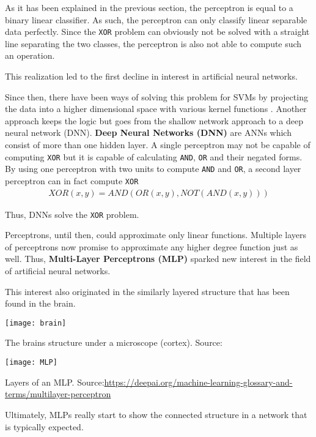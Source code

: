 As it has been explained in the previous section, the perceptron is equal to a binary linear classifier.
As such, the perceptron can only classify linear separable data perfectly.
Since the \lstinline|XOR| problem can obviously not be solved with a straight line separating the two classes, the perceptron is also not able to compute such an operation. 

This realization led to the first decline in interest in artificial neural networks.

Since then, there have been ways of solving this problem for SVMs by projecting the data into a higher dimensional space with various kernel functions \cite{ommer}.
Another approach keeps the logic but goes from the shallow network approach to a deep neural network (DNN).
\textbf{Deep Neural Networks (DNN)} are ANNs which consist of more than one hidden layer.
A single perceptron may not be capable of computing \lstinline|XOR| but it is capable of calculating \lstinline|AND|, \lstinline|OR| and their negated forms.
By using one perceptron with two units to compute \lstinline|AND| and \lstinline|OR|, a second layer perceptron can in fact compute \lstinline|XOR|
\begin{align}
    XOR(x, y) = AND(OR(x, y), NOT(AND(x, y)))
\end{align}

Thus, DNNs solve the \lstinline|XOR| problem.


Perceptrons, until then, could approximate only linear functions.
Multiple layers of perceptrons now promise to approximate any higher degree function just as well.
Thus, \textbf{Multi-Layer Perceptrons (MLP)} sparked new interest in the field of artificial neural networks.

This interest also originated in the similarly layered structure that has been found in the brain.
\begin{marginfigure}
    \texttt{[image: brain]}
    \caption[]{The brains structure under a microscope (cortex). Source:\cite{NN_book}}
\end{marginfigure}
\begin{marginfigure}
    \texttt{[image: MLP]}
    \caption[]{Layers of an MLP. Source:\url{https://deepai.org/machine-learning-glossary-and-terms/multilayer-perceptron}}
\end{marginfigure}
Ultimately, MLPs really start to show the connected structure in a network that is typically expected.


